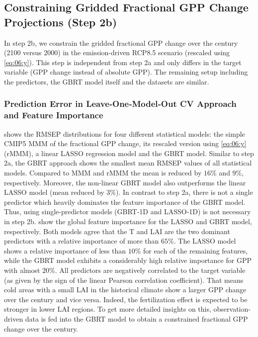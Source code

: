 \subsection{Constraining Gridded Fractional \acs{GPP} Change Projections (Step
  2b)}
\label{subsec:06:results_step2b}

In step 2b, we constrain the gridded fractional \ac{GPP} change over the
 century (2100 versus 2000) in the emission-driven \acs{RCP}8.5
scenario (rescaled using \cref{eq:06:y}). This step is independent from step 2a
and only differs in the target variable (\ac{GPP} change instead of absolute
\ac{GPP}). The remaining setup including the predictors, the \ac{GBRT} model
itself and the datasets are similar.


\subsubsection{Prediction Error in Leave‐One‐Model‐Out \acs{CV} Approach and
  Feature Importance}
\label{subsubsec:06:results_step2b_ml_inference}

 shows the \ac{RMSEP} distributions for four
different statistical models: the simple \acs{CMIP}5 \ac{MMM} of the fractional
\ac{GPP} change, its rescaled version using \cref{eq:06:y} (r\acs{MMM}), a
linear \ac{LASSO} regression model and the \ac{GBRT} model. Similar to step 2a,
the \ac{GBRT} approach shows the smallest mean \ac{RMSEP} values of all
statistical models. Compared to \ac{MMM} and r\acs{MMM} the mean is reduced by
$16 \unit{\%}$ and $9 \unit{\%}$, respectively. Moreover, the non-linear
\ac{GBRT} model also outperforms the linear \ac{LASSO} model (mean reduced by
$3 \unit{\%}$). In contrast to step 2a, there is not a single predictor which
heavily dominates the feature importance of the \ac{GBRT} model. Thus, using
single-predictor models (\acs{GBRT}‐1D and \acs{LASSO}‐1D) is not necessary in
step 2b.  show
the global feature importance for the \ac{LASSO} and \ac{GBRT} model,
respectively. Both models agree that the \acf{T} and \ac{LAI} are the two
dominant predictors with a relative importance of more than $65 \unit{\%}$. The
\ac{LASSO} model shows a relative importance of less than $10 \unit{\%}$ for
each of the remaining features, while the \ac{GBRT} model exhibits a
considerably high relative importance for \ac{GPP} with almost $20 \unit{\%}$.
All predictors are negatively correlated to the target variable (as given by
the sign of the linear Pearson correlation coefficient). That means cold areas
with a small \ac{LAI} in the historical climate show a larger \ac{GPP} change
over the  century and vice versa. Indeed, the fertilization effect is
expected to be stronger in lower \ac{LAI} regions. To get more detailed
insights on this, observation-driven data is fed into the \ac{GBRT} model to
obtain a constrained fractional \ac{GPP} change over the  century.

